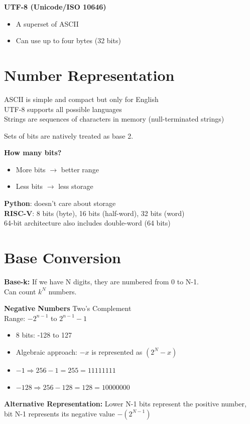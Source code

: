 \documentclass{article}
\begin{document}
\textbf{UTF-8 (Unicode/ISO 10646)}
\begin{itemize}
    \item A superset of ASCII
    \item Can use up to four bytes (32 bits)
\end{itemize}

\section*{Number Representation}
ASCII is simple and compact but only for English \\
UTF-8 supports all possible languages \\
Strings are sequences of characters in memory (null-terminated strings)

Sets of bits are natively treated as base 2.

\textbf{How many bits?}
\begin{itemize}
    \item More bits $\rightarrow$ better range
    \item Less bits $\rightarrow$ less storage
\end{itemize}

\textbf{Python}: doesn't care about storage \\
\textbf{RISC-V}: 8 bits (byte), 16 bits (half-word), 32 bits (word) \\
64-bit architecture also includes double-word (64 bits)

\section*{Base Conversion}
\textbf{Base-k:}
If we have N digits, they are numbered from 0 to N-1. \\
Can count $k^N$ numbers.

\textbf{Negative Numbers}
Two's Complement \\
Range: $-2^{n-1}$ to $2^{n-1}-1$
\begin{itemize}
    \item 8 bits: -128 to 127
    \item Algebraic approach: $-x$ is represented as $(2^N - x)$
    \item $-1 \Rightarrow 256-1 = 255 = 11111111$
    \item $-128 \Rightarrow 256-128 = 128 = 10000000$
\end{itemize}

\textbf{Alternative Representation:}
Lower N-1 bits represent the positive number, bit N-1 represents its negative value $-(2^{N-1})$
\end{document}
